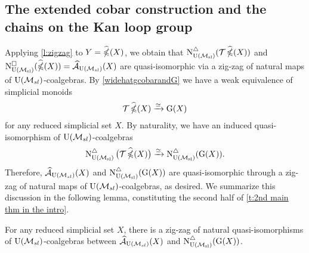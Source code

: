 \subsection{The extended cobar construction and the chains on the Kan loop group}

Applying \cref{l:zigzag} to $Y = \ccobarE(X)$, we obtain that $\schainsUSL (\mathcal{T} \ccobarE(X))$ and $\cchainsUSL(\ccobarE(X)) = \Ahat_{\USL}(X)$ are quasi-isomorphic via a zig-zag of natural maps of $\USL$-coalgebras.
By \cref{widehatgcobarandG} we have a weak equivalence of simplicial monoids
\[
\mathcal{T}\ccobarE(X) \xrightarrow{\simeq} \kan(X)
\]
for any reduced simplicial set $X$.
By naturality, we have an induced quasi-isomorphism of $\USL$-coalgebras
\[
\schainsUSL \big( \mathcal{T} \ccobarE(X) \big) \xra{\simeq}
\schainsUSL (\kan(X)).
\]
Therefore, $\Ahat_{\USL}(X)$ and $\schainsUSL(\kan(X))$ are quasi-isomorphic through a zig-zag of natural maps of $\USL$-coalgebras, as desired.
We summarize this discussion in the following lemma, constituting the second half of \cref{t:2nd main thm in the intro}.

\begin{lemma}
	For any reduced simplicial set $X$, there is a zig-zag of natural quasi-isomorphisms of $\USL$-coalgebras between $\Ahat_\USL(X)$ and $\schainsUSL(\kan(X))$.
\end{lemma}